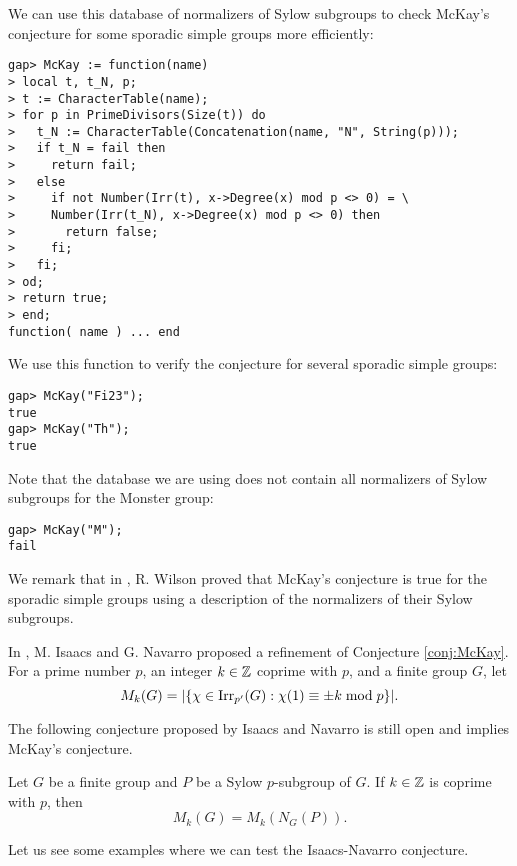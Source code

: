 \begin{example}
We can use this database of normalizers of Sylow subgroups to check 
McKay's conjecture for some sporadic simple groups 
more efficiently:
\begin{lstlisting}
gap> McKay := function(name)
> local t, t_N, p;
> t := CharacterTable(name);
> for p in PrimeDivisors(Size(t)) do
>   t_N := CharacterTable(Concatenation(name, "N", String(p)));
>   if t_N = fail then
>     return fail;
>   else
>     if not Number(Irr(t), x->Degree(x) mod p <> 0) = \ 
>     Number(Irr(t_N), x->Degree(x) mod p <> 0) then
>       return false;
>     fi;
>   fi;
> od;
> return true;
> end;
function( name ) ... end
\end{lstlisting}
We use this function to verify the conjecture
for several sporadic simple groups:
\begin{lstlisting}
gap> McKay("Fi23");
true
gap> McKay("Th");
true
\end{lstlisting}
Note that the database we are using 
does not contain all normalizers 
of Sylow subgroups for the Monster
group:
\begin{lstlisting}
gap> McKay("M");
fail
\end{lstlisting}
We remark that in \cite{MR1643110}, R. Wilson proved that
McKay's conjecture is true
for the sporadic simple groups using a description of 
the normalizers of their Sylow subgroups. 
\end{example}

In \cite{MR1935849}, M. Isaacs and G. Navarro 
proposed a refinement of Conjecture \ref{conj:McKay}.
For a prime number $p$, an integer $k\in\mathbb{Z}$ coprime with $p$, and a finite group $G$, let
\[
  M_k(G)=|\{\chi\in\operatorname{Irr}_{p'}(G):\chi(1)\equiv\pm k\bmod p\}|.
\]

The following conjecture proposed by Isaacs and Navarro is still open and implies McKay's conjecture.

\begin{conjecture}
Let $G$ be a finite group and $P$ be a Sylow $p$-subgroup
of $G$. If $k\in\mathbb{Z}$ is coprime with $p$, then 
\[
    M_k(G)=M_k(N_G(P)).
\]
\end{conjecture}

Let us see some examples where we can test the Isaacs-Navarro conjecture.

